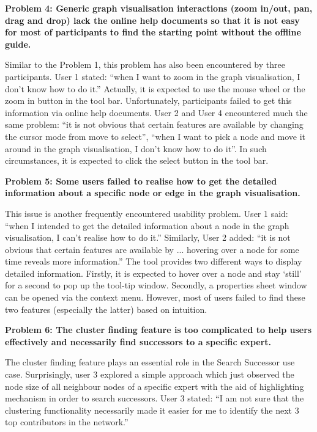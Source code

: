\textbf{Problem 4: Generic graph visualisation interactions (zoom in/out, pan, drag and drop) lack the online help documents so that it is not easy for most of participants to find the starting point without the offline guide.}

Similar to the Problem 1, this problem has also been encountered by three participants. User 1 stated: ``when I want to zoom in the graph visualisation, I don't know how to do it.'' Actually, it is expected to use the mouse wheel or the zoom in button in the tool bar. Unfortunately, participants failed to get this information via online help documents. User 2 and User 4 encountered much the same problem: ``it is not obvious that certain features are available by changing the cursor mode from move to select'', ``when I want to pick a node and move it around in the graph visualisation, I don't know how to do it''. In such circumstances, it is expected to click the select button in the tool bar.

\textbf{Problem 5: Some users failed to realise how to get the detailed information about a specific node or edge in the graph visualisation.}

This issue is another frequently encountered usability problem. User 1 said: ``when I intended to get the detailed information about a node in the graph visualisation, I can't realise how to do it.'' Similarly, User 2 added: ``it is not obvious that certain features are available by ... hovering over a node for some time reveals more information.'' The tool provides two different ways to display detailed information. Firstly, it is expected to hover over a node and stay `still' for a second to pop up the tool-tip window. Secondly, a properties sheet window can be opened via the context menu. However, most of users failed to find these two features (especially the latter) based on intuition.

\textbf{Problem 6: The cluster finding feature is too complicated to help users effectively and necessarily find successors to a specific expert.}

The cluster finding feature plays an essential role in the Search Successor use case. Surprisingly, user 3 explored a simple approach which just observed the node size of all neighbour nodes of a specific expert with the aid of highlighting mechanism in order to search successors. User 3 stated: ``I am not sure that the clustering functionality necessarily made it easier for me to identify the next 3 top contributors in the network.'' 

